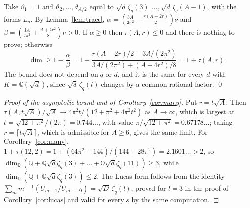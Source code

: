 \documentclass[11pt]{amsart}
\theoremstyle{definition}
\theoremstyle{remark}
\numberwithin{equation}{section}
\newcommand{\QQ}{\mathbb{Q}}
\begin{document}
Take $\vartheta_1=1$ and $\vartheta_2,\dots,\vartheta_{A/2}$ equal to $\sqrt d\,\zeta_q(3),\dots,\sqrt d\,
\zeta_q(A-1)$, with the forms $L_n$. By Lemma~\ref{lem:trace},
$\alpha=(\frac{3A}{2\pi^2}-\frac{r(A-2r)}2)\nu$ and $\beta=(\frac{3A}{2\pi^2}+\frac{A+4r^2}8)\nu>0$. If $\alpha\ge0$
then $\tau(A,r)\le0$ and there is nothing to prove; otherwise
\[
\dim\ge1-\frac\alpha\beta=1+\frac{r(A-2r)/2-3A/(2\pi^2)}{3A/(2\pi^2)+(A+4r^2)/8}=1+\tau(A,r).
\]
The bound does not depend on $q$ or $d$, and it is the same for every $d$ with $K=\QQ(\sqrt d)$, since
$\sqrt d\,\zeta_q(l)$ changes by a common rational factor. \qed

\begin{proof}[Proof of the asymptotic bound and of Corollary~\ref{cor:many}]
Put $r=t\sqrt A$. Then $\tau(A,t\sqrt A)/\sqrt A\to4\pi^2t/(12+\pi^2+4\pi^2t^2)$ as $A\to\infty$, which is largest at
$t=\sqrt{12+\pi^2}/(2\pi)=0.744\ldots$, with value $\pi/\sqrt{12+\pi^2}=0.67178\ldots$; taking
$r=\lceil t\sqrt A\rceil$, which is admissible for $A\ge6$, gives the same limit. For Corollary~\ref{cor:many},
$1+\tau(12,2)=1+(64\pi^2-144)/(144+28\pi^2)=2.1601\ldots>2$, so
$\dim_\QQ(\QQ+\QQ\sqrt d\zeta_q(3)+\dots+\QQ\sqrt d\zeta_q(11))\ge3$, while $\dim_\QQ(\QQ+\QQ\sqrt d\zeta_q(3))\le2$.
The Lucas form follows from the identity $\sum_mm^{l-1}(U_{m+1}/U_m-\eta)=\sqrt D\,\zeta_q(l)$, proved for $l=3$ in the
proof of Corollary~\ref{cor:lucas} and valid for every $s$ by the same computation.
\end{proof}
\end{document}
